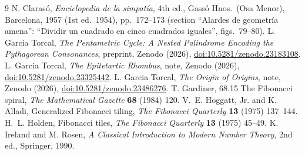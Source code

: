 \documentclass[11pt,a4paper]{article}
\theoremstyle{plain}
\theoremstyle{definition}
\theoremstyle{remark}
\begin{document}
\begin{thebibliography}{9}\small
{} N. Clarasó, \emph{Enciclopedia de la simpatía}, 4th ed., Gassó Hnos.\ (Osa Menor), Barcelona, 1957 (1st ed.\ 1954), pp.~172--173 (section ``Alardes de geometría amena'': ``Dividir un cuadrado en cinco cuadrados iguales'', figs.~79--80).
 L. Garcia Torcal, \emph{The Pentametric Cycle: A Nested Palindrome Encoding the Pythagorean Consonances}, preprint, Zenodo (2026), \href{https://doi.org/10.5281/zenodo.23183108}{doi:10.5281/zenodo.23183108}.
 L. Garcia Torcal, \emph{The Epitetartic Rhombus}, note, Zenodo (2026), \href{https://doi.org/10.5281/zenodo.23325442}{doi:10.5281/zenodo.23325442}.
 L. Garcia Torcal, \emph{The Origin of Origins}, note, Zenodo (2026), \href{https://doi.org/10.5281/zenodo.23486276}{doi:10.5281/zenodo.23486276}.
 T. Gardiner, 68.15 The Fibonacci spiral, \emph{The Mathematical Gazette} \textbf{68} (1984) 120.
 V.~E. Hoggatt, Jr. and K. Alladi, Generalized Fibonacci tiling, \emph{The Fibonacci Quarterly} \textbf{13} (1975) 137--144.
 H.~L. Holden, Fibonacci tiles, \emph{The Fibonacci Quarterly} \textbf{13} (1975) 45--49.
 K. Ireland and M. Rosen, \emph{A Classical Introduction to Modern Number Theory}, 2nd ed., Springer, 1990.
\end{thebibliography}
\end{document}
